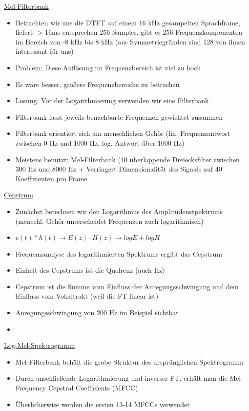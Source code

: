 \documentclass[a4paper,10pt,oneside]{article}
\begin{document}
\underline{Mel-Filterbank} \\
	\begin{itemize}
		\item Betrachten wir uns die DTFT auf einem 16 kHz gesampelten Sprachframe, liefert -> 16ms entsprechen 256 Samples, gibt es 256 Frequenzkomponenten im Bereich von -8 kHz bis 8 kHz (aus Symmetriegründen sind 128 von ihnen interessant für uns)
		\item Problem: Diese Auflösung im Frequenzbereich ist viel zu hoch
		\item Es wäre besser, größere Frequenzbereiche zu betrachen
		\item Lösung: Vor der Logarithmierung verwenden wir eine Filterbank
		\item Filterbank fasst jeweils benachbarte Frequenzen gewichtet zusammen
		\item Filterbank orientiert sich am menschlichen Gehör (lin. Frequenzantwort zwischen 0 Hz und 1000 Hz, log. Antwort über 1000 Hz)
		\item Meistens benutzt: Mel-Filterbank (40 überlappende Dreiecksfilter zwischen 300 Hz und 8000 Hz + Verringert Dimensionalität des Signals auf 40 Koeffizienten pro Frame
	\end{itemize}
	
\underline{Cepstrum} \\
 	\begin{itemize}
 		\item Zunächst berechnen wir den Logarithmus des Amplitudenstpektrums (menschl. Gehör unterscheidet Frequenzen auch logarithmisch)
 		\item $e(t) * h(t) \rightarrow E(z) \cdot H(z) \rightarrow log E + log H$
 		\item Frequenzanalyse des logarithmierten Spektrums ergibt das Cepstrum
 		\item Einheit des Cepstrums ist die Quefrenz (auch Hz)
 		\item Cepstrum ist die Summe vom Einfluss der Anregungsschwingung und dem Einfluss vom Vokaltrakt (weil die FT linear ist)
 		\item Anregungsschwingung von 200 Hz im Beispiel sichtbar
 		\item[] %
 	\end{itemize}
 	
\underline{Log-Mel-Spektrogramm} \\
	\begin{itemize}
		\item Mel-Filterbank behält die grobe Struktur des ursprünglichen Spektrogramm
		\item Durch anschließende Logarithmierung und inverser FT, erhält man die Mel-Frequency Cepstral Coefficients (MFCC)
		\item Überlicherwise werden die ersten 13-14 MFCCs verwendet
	\end{itemize}	
	
\end{document}
